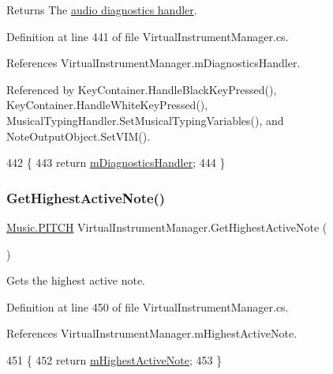 \begin{DoxyReturn}{Returns}
The \hyperlink{group___audio_testing_class_a_t_i___diagnostics}{audio diagnostics handler}. 
\end{DoxyReturn}


Definition at line 441 of file Virtual\+Instrument\+Manager.\+cs.



References Virtual\+Instrument\+Manager.\+m\+Diagnostics\+Handler.



Referenced by Key\+Container.\+Handle\+Black\+Key\+Pressed(), Key\+Container.\+Handle\+White\+Key\+Pressed(), Musical\+Typing\+Handler.\+Set\+Musical\+Typing\+Variables(), and Note\+Output\+Object.\+Set\+V\+I\+M().


\begin{DoxyCode}
442         \{
443             \textcolor{keywordflow}{return} \hyperlink{group___v_i_m_priv_gafabe4a874fc21f7bcedf431df3b94201}{mDiagnosticsHandler};
444         \}
\end{DoxyCode}
\mbox{\label{group___v_i_m_pub_func_gab58eabfbcdaa60a3a7dbd972df6f57a6}} 
\subsubsection{\texorpdfstring{Get\+Highest\+Active\+Note()}{GetHighestActiveNote()}}
{\footnotesize\ttfamily \hyperlink{group___music_enums_ga508f69b199ea518f935486c990edac1d}{Music.\+P\+I\+T\+CH} Virtual\+Instrument\+Manager.\+Get\+Highest\+Active\+Note (\begin{DoxyParamCaption}{ }\end{DoxyParamCaption})}



Gets the highest active note. 



Definition at line 450 of file Virtual\+Instrument\+Manager.\+cs.



References Virtual\+Instrument\+Manager.\+m\+Highest\+Active\+Note.


\begin{DoxyCode}
451     \{
452         \textcolor{keywordflow}{return} \hyperlink{group___v_i_m_priv_ga73a09a4e4f09c0e5b3871dc9ad6c757e}{mHighestActiveNote};
453     \}
\end{DoxyCode}
\mbox{\label{group___v_i_m_pub_func_ga586d5ed5b0fe832d66c9a99aa160ceee}} 

